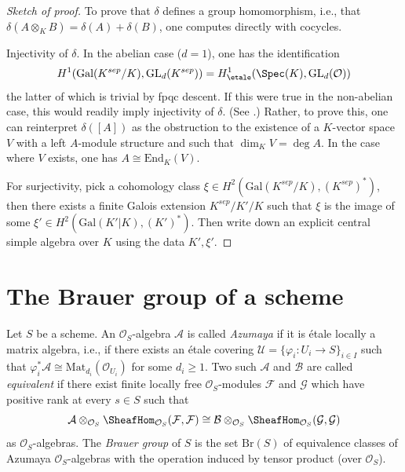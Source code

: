\begin{proof}[Sketch of proof]
To prove that $\delta$ defines a group homomorphism, i.e., that
$\delta(A \otimes_K B) = \delta(A) + \delta(B)$, one computes
directly with cocycles.

\medskip\noindent
Injectivity of $\delta$. In the abelian case ($d = 1$), one has the
identification
$$
H^1(\text{Gal}(K^{sep}/K), \text{GL}_d(K^{sep})) =
H_\etale^1(\Spec(K), \text{GL}_d(\mathcal{O}))
$$
the latter of which is trivial by fpqc descent. If this were true in the
non-abelian case, this would readily imply injectivity of $\delta$. (See
\cite{SGA4.5}.) Rather, to prove this, one can reinterpret $\delta([A])$ as the
obstruction to the existence of a $K$-vector space $V$ with a left $A$-module
structure and such that $\dim_K V = \deg A$. In the case where $V$ exists, one
has $A \cong \text{End}_K(V)$.

\medskip\noindent
For surjectivity, pick a
cohomology class $\xi \in H^2(\text{Gal}(K^{sep}/K), (K^{sep})^*)$,
then there exists a finite Galois extension $K^{sep}/K'/K$
such that $\xi$ is the image of some
$\xi' \in H^2(\text{Gal}(K'|K), (K')^*)$. Then write
down an explicit central simple algebra over $K$ using the data $K', \xi'$.
\end{proof}

\section{The Brauer group of a scheme}
\label{etale-cohomology-section-brauer-scheme}
Let $S$ be a scheme. An $\mathcal{O}_S$-algebra
$\mathcal{A}$ is called {\it Azumaya} if it is \'etale locally a matrix
algebra, i.e., if there exists an \'etale covering
$\mathcal{U} = \{ \varphi_i : U_i \to S\}_{i \in I}$ such that
$\varphi_i^*\mathcal{A} \cong \text{Mat}_{d_i}(\mathcal{O}_{U_i})$
for some $d_i \geq 1$. Two such
$\mathcal{A}$ and $\mathcal{B}$ are called {\it equivalent} if there exist
finite locally free $\mathcal{O}_S$-modules $\mathcal{F}$ and $\mathcal{G}$
which have positive rank at every $s \in S$ such that
$$
\mathcal{A} \otimes_{\mathcal{O}_S}
\SheafHom_{\mathcal{O}_S}(\mathcal{F}, \mathcal{F})
\cong
\mathcal{B} \otimes_{\mathcal{O}_S}
\SheafHom_{\mathcal{O}_S}(\mathcal{G}, \mathcal{G})
$$
as $\mathcal{O}_S$-algebras. The {\it Brauer group} of
$S$ is the set $\text{Br}(S)$ of equivalence classes of Azumaya
$\mathcal{O}_S$-algebras with the operation induced by tensor product (over
$\mathcal{O}_S$).

